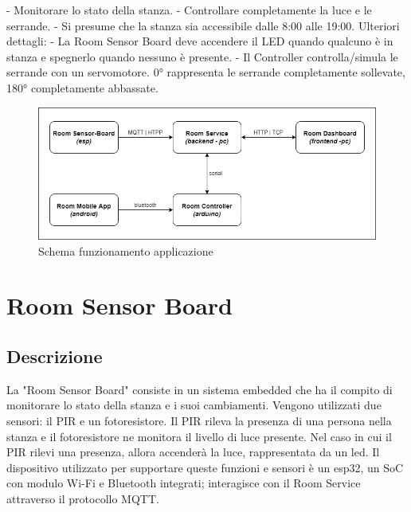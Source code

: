 \documentclass[12pt]{article}
\begin{document}
- Monitorare lo stato della stanza.\newline
- Controllare completamente la luce e le serrande.\newline
- Si presume che la stanza sia accessibile dalle 8:00 alle 19:00.\newline
Ulteriori dettagli:\newline
- La Room Sensor Board deve accendere il LED quando qualcuno è in stanza e spegnerlo quando nessuno è presente.\newline
- Il Controller controlla/simula le serrande con un servomotore. 0° rappresenta le serrande completamente sollevate, 180° completamente abbassate.
\vskip 0.3cm
\begin{figure}[H]
    \includegraphics[width=17cm]{application-schema.png}
    \centering
    \caption{Schema funzionamento applicazione}
    \centering
\end{figure}
\newpage


\section{Room Sensor Board}

\subsection{Descrizione}
La "Room Sensor Board" consiste in un sistema embedded che ha il compito di monitorare lo stato della stanza e i suoi cambiamenti. Vengono utilizzati due sensori: il PIR e un fotoresistore. Il PIR rileva la presenza di una persona nella stanza e il fotoresistore ne monitora il livello di luce presente. Nel caso in cui il PIR rilevi una presenza, allora accenderà la luce, rappresentata da un led. Il dispositivo utilizzato per supportare queste funzioni e sensori è un esp32, un SoC con modulo Wi-Fi e Bluetooth integrati; interagisce con il Room Service attraverso il protocollo MQTT.
\end{document}

